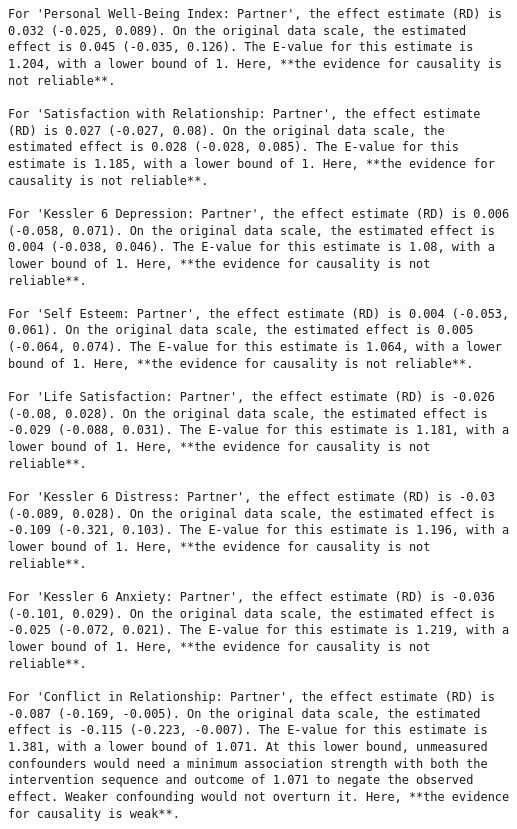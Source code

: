 \documentclass[
  singlecolumn]{article}
\begin{document}
\begin{verbatim}
For 'Personal Well-Being Index: Partner', the effect estimate (RD) is 0.032 (-0.025, 0.089). On the original data scale, the estimated effect is 0.045 (-0.035, 0.126). The E-value for this estimate is 1.204, with a lower bound of 1. Here, **the evidence for causality is not reliable**.

For 'Satisfaction with Relationship: Partner', the effect estimate (RD) is 0.027 (-0.027, 0.08). On the original data scale, the estimated effect is 0.028 (-0.028, 0.085). The E-value for this estimate is 1.185, with a lower bound of 1. Here, **the evidence for causality is not reliable**.

For 'Kessler 6 Depression: Partner', the effect estimate (RD) is 0.006 (-0.058, 0.071). On the original data scale, the estimated effect is 0.004 (-0.038, 0.046). The E-value for this estimate is 1.08, with a lower bound of 1. Here, **the evidence for causality is not reliable**.

For 'Self Esteem: Partner', the effect estimate (RD) is 0.004 (-0.053, 0.061). On the original data scale, the estimated effect is 0.005 (-0.064, 0.074). The E-value for this estimate is 1.064, with a lower bound of 1. Here, **the evidence for causality is not reliable**.

For 'Life Satisfaction: Partner', the effect estimate (RD) is -0.026 (-0.08, 0.028). On the original data scale, the estimated effect is -0.029 (-0.088, 0.031). The E-value for this estimate is 1.181, with a lower bound of 1. Here, **the evidence for causality is not reliable**.

For 'Kessler 6 Distress: Partner', the effect estimate (RD) is -0.03 (-0.089, 0.028). On the original data scale, the estimated effect is -0.109 (-0.321, 0.103). The E-value for this estimate is 1.196, with a lower bound of 1. Here, **the evidence for causality is not reliable**.

For 'Kessler 6 Anxiety: Partner', the effect estimate (RD) is -0.036 (-0.101, 0.029). On the original data scale, the estimated effect is -0.025 (-0.072, 0.021). The E-value for this estimate is 1.219, with a lower bound of 1. Here, **the evidence for causality is not reliable**.

For 'Conflict in Relationship: Partner', the effect estimate (RD) is -0.087 (-0.169, -0.005). On the original data scale, the estimated effect is -0.115 (-0.223, -0.007). The E-value for this estimate is 1.381, with a lower bound of 1.071. At this lower bound, unmeasured confounders would need a minimum association strength with both the intervention sequence and outcome of 1.071 to negate the observed effect. Weaker confounding would not overturn it. Here, **the evidence for causality is weak**.
\end{verbatim}
\end{document}

